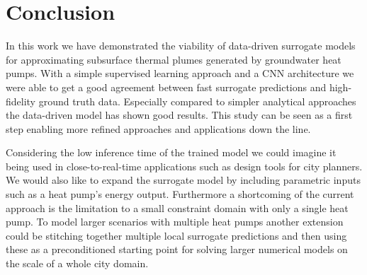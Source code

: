 \documentclass{article} %
\begin{document}


\section{Conclusion}
\label{sec:conclusion}

In this work we have demonstrated the viability of data-driven surrogate models for approximating subsurface thermal plumes generated by groundwater heat pumps.
With a simple supervised learning approach and a CNN architecture we were able to get a good agreement between fast surrogate predictions and high-fidelity ground truth data.
Especially compared to simpler analytical approaches the data-driven model has shown good results.
This study can be seen as a first step enabling more refined approaches and applications down the line.


Considering the low inference time of the trained model we could imagine it being used in close-to-real-time applications such as design tools for city planners.
We would also like to expand the surrogate model by including parametric inputs such as a heat pump's energy output.
Furthermore a shortcoming of the current approach is the limitation to a small constraint domain with only a single heat pump.
To model larger scenarios with multiple heat pumps another extension could be stitching together multiple local surrogate predictions and then using these as a preconditioned starting point for solving larger numerical models on the scale of a whole city domain.


% 



\end{document}
